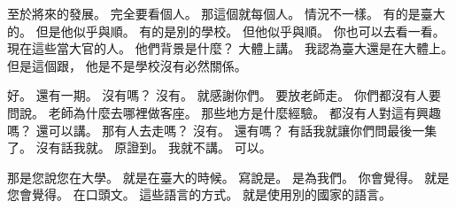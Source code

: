 \hypertarget{c01:cue:4073}{}至於將來的發展。
\hypertarget{c01:cue:4074}{}完全要看個人。
\hypertarget{c01:cue:4075}{}那這個就每個人。
\hypertarget{c01:cue:4076}{}情況不一樣。
\hypertarget{c01:cue:4077}{}有的是臺大的。
\hypertarget{c01:cue:4078}{}但是他似乎與順。
\hypertarget{c01:cue:4079}{}有的是別的學校。
\hypertarget{c01:cue:4080}{}但他似乎與順。
\hypertarget{c01:cue:4081}{}你也可以去看一看。
\hypertarget{c01:cue:4082}{}現在這些當大官的人。
\hypertarget{c01:cue:4083}{}他們背景是什麼？
\hypertarget{c01:cue:4084}{}大體上講。
\hypertarget{c01:cue:4085}{}我認為臺大還是在大體上。
\hypertarget{c01:cue:4086}{}但是這個跟，
\hypertarget{c01:cue:4087}{}他是不是學校沒有必然關係。

\hypertarget{c01:cue:4088}{}好。
\hypertarget{c01:cue:4089}{}還有一期。
\hypertarget{c01:cue:4090}{}沒有嗎？
\hypertarget{c01:cue:4091}{}沒有。
\hypertarget{c01:cue:4092}{}就感謝你們。
\hypertarget{c01:cue:4093}{}要放老師走。
\hypertarget{c01:cue:4094}{}你們都沒有人要問說。
\hypertarget{c01:cue:4095}{}老師為什麼去哪裡做客座。
\hypertarget{c01:cue:4096}{}那些地方是什麼經驗。
\hypertarget{c01:cue:4097}{}都沒有人對這有興趣嗎？
\hypertarget{c01:cue:4098}{}還可以講。
\hypertarget{c01:cue:4099}{}那有人去走嗎？
\hypertarget{c01:cue:4100}{}沒有。
\hypertarget{c01:cue:4101}{}還有嗎？
\hypertarget{c01:cue:4102}{}有話我就讓你們問最後一集了。
\hypertarget{c01:cue:4103}{}沒有話我就。
\hypertarget{c01:cue:4104}{}原證到。
\hypertarget{c01:cue:4105}{}我就不講。
\hypertarget{c01:cue:4106}{}可以。

\hypertarget{c01:cue:4107}{}那是您說您在大學。
\hypertarget{c01:cue:4108}{}就是在臺大的時候。
\hypertarget{c01:cue:4109}{}寫說是。
\hypertarget{c01:cue:4110}{}是為我們。
\hypertarget{c01:cue:4111}{}你會覺得。
\hypertarget{c01:cue:4112}{}就是您會覺得。
\hypertarget{c01:cue:4113}{}在口頭文。
\hypertarget{c01:cue:4114}{}這些語言的方式。
\hypertarget{c01:cue:4115}{}就是使用別的國家的語言。

